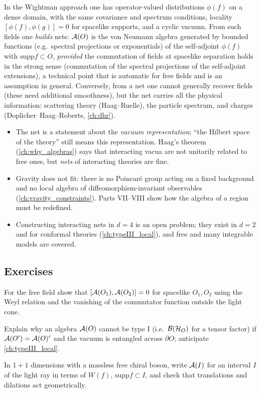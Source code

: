 In the Wightman approach one has operator-valued distributions $\phi(f)$ on a dense domain, with the same covariance and spectrum conditions, locality $[\phi(f),\phi(g)]=0$ for spacelike supports, and a cyclic vacuum. From such fields one \emph{builds} nets: $\mathcal{A}(O)$ is the von Neumann algebra generated by bounded functions (e.g.\ spectral projections or exponentials) of the self-adjoint $\phi(f)$ with $\mathrm{supp}f\subset O$, \emph{provided} the commutation of fields at spacelike separation holds in the strong sense (commutation of the spectral projections of the self-adjoint extensions), a technical point that is automatic for free fields and is an assumption in general. Conversely, from a net one cannot generally recover fields (these need additional smoothness), but the net carries all the physical information: scattering theory (Haag--Ruelle), the particle spectrum, and charges (Doplicher--Haag--Roberts, \cref{ch:dhr}).

\begin{whatwrong}
\begin{itemize}
\item The net is a statement about the \emph{vacuum representation}; ``the Hilbert space of the theory'' still means this representation. Haag's theorem (\cref{ch:why_algebras}) says that interacting vacua are not unitarily related to free ones, but \emph{nets} of interacting theories are fine.
\item Gravity does not fit: there is no Poincar\'e group acting on a fixed background and no local algebra of diffeomorphism-invariant observables (\cref{ch:gravity_constraints}). Parts VII--VIII show how the algebra of a region must be redefined.
\item Constructing interacting nets in $d=4$ is an open problem; they exist in $d=2$ and for conformal theories (\cref{ch:typeIII_local}), and free and many integrable models are covered.
\end{itemize}
\end{whatwrong}

\subsection*{Exercises}
\begin{exercise}\label{ex:haagkastler:1}
For the free field show that $[\mathcal{A}(O_1),\mathcal{A}(O_2)]=0$ for spacelike $O_1,O_2$ using the Weyl relation and the vanishing of the commutator function outside the light cone.
\end{exercise}
\begin{exercise}\label{ex:haagkastler:2}
Explain why an algebra $\mathcal{A}(O)$ cannot be type I (i.e.\ $\mathcal{B}(\mathcal{H}_O)$ for a tensor factor) if $\mathcal{A}(O')=\mathcal{A}(O)'$ and the vacuum is entangled across $\partial O$; anticipate \cref{ch:typeIII_local}.
\end{exercise}
\begin{exercise}\label{ex:haagkastler:3}
In $1+1$ dimensions with a massless free chiral boson, write $\mathcal{A}(I)$ for an interval $I$ of the light ray in terms of $W(f)$, $\mathrm{supp}f\subset I$, and check that translations and dilations act geometrically.
\end{exercise}


